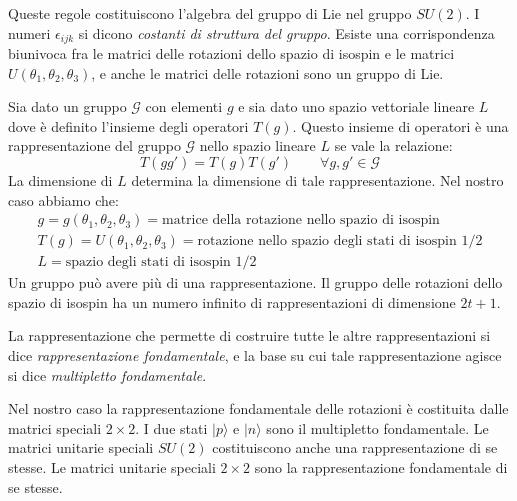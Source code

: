 Queste regole costituiscono l'algebra del gruppo di Lie nel gruppo $SU(2)$.
I numeri $\epsilon_{ijk}$ si dicono \textit{costanti di struttura del gruppo}.
Esiste una corrispondenza biunivoca fra le matrici delle rotazioni dello spazio
di isospin e le matrici $U(\theta_1,\theta_2,\theta_3)$, e anche le matrici
delle rotazioni sono un gruppo di Lie.

Sia dato un gruppo $\mathscr{G}$ con elementi $g$ e sia dato uno spazio
vettoriale lineare $L$ dove è definito l'insieme degli operatori $T(g)$.
Questo insieme di operatori è una rappresentazione del gruppo $\mathscr{G}$
nello spazio lineare $L$ se vale la relazione:
\[
T(gg')=T(g)T(g')\qquad \forall g,g'\in\mathscr{G}
\]
La dimensione di $L$ determina la dimensione di tale rappresentazione.
Nel nostro caso abbiamo che:
\begin{gather}
g=g(\theta_1,\theta_2,\theta_3)=\text{matrice della rotazione nello spazio di 
isospin}\\
T(g)=U(\theta_1,\theta_2,\theta_3)=\text{rotazione nello spazio degli stati di 
isospin $1/2$}\\
L=\text{spazio degli stati di isospin $1/2$}
\end{gather}
Un gruppo può avere più di una rappresentazione.
Il gruppo delle rotazioni dello spazio di isospin ha un numero infinito di
rappresentazioni di dimensione $2t+1$.

La rappresentazione che permette di costruire tutte le altre rappresentazioni si
dice \textit{rappresentazione fondamentale}, e la base su cui tale
rappresentazione agisce si dice \textit{multipletto fondamentale}.

Nel nostro caso la rappresentazione fondamentale delle rotazioni è costituita
dalle matrici speciali $2\times 2$.
I due stati $|p\rangle$ e $|n\rangle$ sono il multipletto fondamentale.
Le matrici unitarie speciali $SU(2)$ costituiscono anche una rappresentazione di
se stesse.
Le matrici unitarie speciali $2\times 2$ sono la rappresentazione fondamentale
di se stesse.

